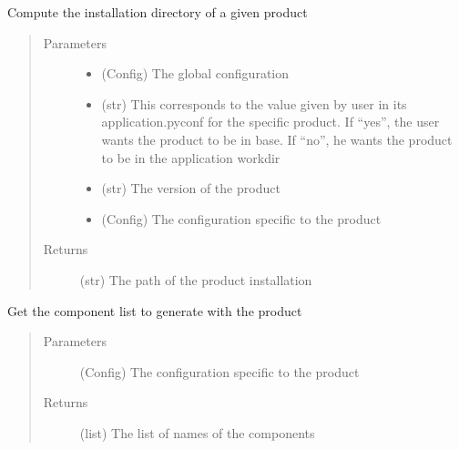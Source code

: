 \documentclass[a4paper,10pt,english]{sphinxmanual}
\begin{document}
\begin{fulllineitems}
\label{\detokenize{apidoc_src/src:src.product.get_install_dir}}
Compute the installation directory of a given product
\begin{quote}\begin{description}
\item[{Parameters}] \leavevmode\begin{itemize}
\item {} 
 \textendash{} (Config) The global configuration

\item {} 
 \textendash{} (str) 
This corresponds to the value given by user in its application.pyconf 
for the specific product. 
If “yes”, the user wants the product to be in base. 
If “no”, he wants the product to be in the application workdir

\item {} 
 \textendash{} (str) The version of the product

\item {} 
 \textendash{} (Config) The configuration specific to the product

\end{itemize}

\item[{Returns}] \leavevmode
(str) The path of the product installation

\end{description}\end{quote}

\end{fulllineitems}


\begin{fulllineitems}
\label{\detokenize{apidoc_src/src:src.product.get_product_components}}
Get the component list to generate with the product
\begin{quote}\begin{description}
\item[{Parameters}] \leavevmode
{} \textendash{} (Config)
The configuration specific to the product

\item[{Returns}] \leavevmode
(list) The list of names of the components

\end{description}\end{quote}

\end{fulllineitems}
\end{document}
